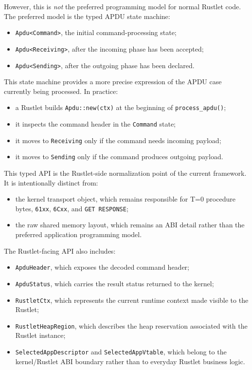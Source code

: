 However, this is \emph{not} the preferred programming model for normal
Rustlet code. The preferred model is the typed APDU state machine:
\begin{itemize}
\item \texttt{Apdu<Command>}, the initial command-processing state;
\item \texttt{Apdu<Receiving>}, after the incoming phase has been
  accepted;
\item \texttt{Apdu<Sending>}, after the outgoing phase has been
  declared.
\end{itemize}

This state machine provides a more precise expression of the APDU case
currently being processed. In practice:
\begin{itemize}
\item a Rustlet builds \texttt{Apdu::new(ctx)} at the beginning of
  \texttt{process\_apdu()};
\item it inspects the command header in the \texttt{Command} state;
\item it moves to \texttt{Receiving} only if the command needs incoming
  payload;
\item it moves to \texttt{Sending} only if the command produces outgoing
  payload.
\end{itemize}

This typed API is the Rustlet-side normalization point of the current
framework. It is intentionally distinct from:
\begin{itemize}
\item the kernel transport object, which remains responsible for T=0
  procedure bytes, \texttt{61xx}, \texttt{6Cxx}, and \texttt{GET
  RESPONSE};
\item the raw shared memory layout, which remains an ABI detail rather
  than the preferred application programming model.
\end{itemize}

The Rustlet-facing API also includes:
\begin{itemize}
\item \texttt{ApduHeader}, which exposes the decoded command header;
\item \texttt{ApduStatus}, which carries the result status returned to
  the kernel;
\item \texttt{RustletCtx}, which represents the current runtime context
  made visible to the Rustlet;
\item \texttt{RustletHeapRegion}, which describes the heap reservation
  associated with the Rustlet instance;
\item \texttt{SelectedAppDescriptor} and \texttt{SelectedAppVtable},
  which belong to the kernel/Rustlet ABI boundary rather than to
  everyday Rustlet business logic.
\end{itemize}

